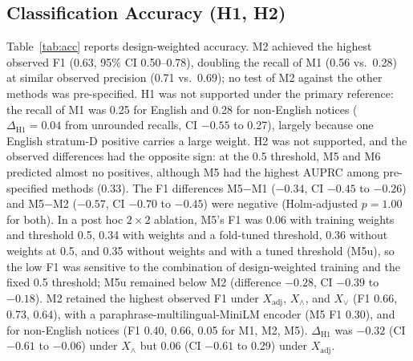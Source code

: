 \documentclass[runningheads]{llncs}
\begin{document}
\subsection{Classification Accuracy (H1, H2)}
Table~\ref{tab:acc} reports design-weighted accuracy. M2 achieved the highest observed F1 (0.63, 95\% CI 0.50--0.78), doubling the recall of M1 (0.56 vs.\ 0.28) at similar observed precision (0.71 vs.\ 0.69); no test of M2 against the other methods was pre-specified. H1 was not supported under the primary reference: the recall of M1 was 0.25 for English and 0.28 for non-English notices ($\Delta_{\mathrm{H1}}=0.04$ from unrounded recalls, CI $-0.55$ to 0.27), largely because one English stratum-D positive carries a large weight. H2 was not supported, and the observed differences had the opposite sign: at the 0.5 threshold, M5 and M6 predicted almost no positives, although M5 had the highest AUPRC among pre-specified methods (0.33). The F1 differences M5$-$M1 ($-0.34$, CI $-0.45$ to $-0.26$) and M5$-$M2 ($-0.57$, CI $-0.70$ to $-0.45$) were negative (Holm-adjusted $p=1.00$ for both). In a post hoc $2\times2$ ablation, M5's F1 was 0.06 with training weights and threshold 0.5, 0.34 with weights and a fold-tuned threshold, 0.36 without weights at 0.5, and 0.35 without weights and with a tuned threshold (M5u), so the low F1 was sensitive to the combination of design-weighted training and the fixed 0.5 threshold; M5u remained below M2 (difference $-0.28$, CI $-0.39$ to $-0.18$). M2 retained the highest observed F1 under $X_{\mathrm{adj}}$, $X_\wedge$, and $X_\vee$ (F1 0.66, 0.73, 0.64), with a paraphrase-multilingual-MiniLM encoder (M5 F1 0.30), and for non-English notices (F1 0.40, 0.66, 0.05 for M1, M2, M5). $\Delta_{\mathrm{H1}}$ was $-0.32$ (CI $-0.61$ to $-0.06$) under $X_\wedge$ but 0.06 (CI $-0.61$ to 0.29) under $X_{\mathrm{adj}}$.
\end{document}
